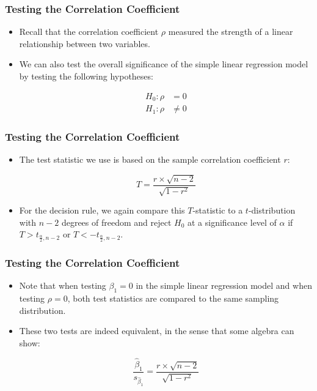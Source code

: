 \documentclass[12pt]{beamer}
\begin{document}
	\begin{frame}
		\frametitle{Testing the Correlation Coefficient}
		
		\begin{itemize}[label={\color{blue}$\blacktriangleright$}]
			\item Recall that the correlation coefficient $\rho$ measured the strength of a linear relationship between two variables.
			
			\item We can also test the overall significance of the simple linear regression model by testing the following hypotheses:
			
			\[
			\begin{aligned}
				H_0 : \rho &= 0 \\
				H_1 : \rho &\neq 0
			\end{aligned}
			\]
			
		\end{itemize}
		
	\end{frame}
	\begin{frame}
		\frametitle{Testing the Correlation Coefficient}
		
		\begin{itemize}[label={\color{blue}$\blacktriangleright$}]
			\item The test statistic we use is based on the sample correlation coefficient $r$:
			
			\[
			T = \frac{r \times \sqrt{n-2}}{\sqrt{1-r^2}}
			\]
			
			\item For the decision rule, we again compare this $T$-statistic to a $t$-distribution with $n-2$ degrees of freedom and reject $H_0$ at a significance level of $\alpha$ if $T > t_{\frac{\alpha}{2},n-2}$ or $T < -t_{\frac{\alpha}{2},n-2}$.
			
		\end{itemize}
		
	\end{frame}
	\begin{frame}
		\frametitle{Testing the Correlation Coefficient}
		
		\begin{itemize}[label={\color{blue}$\blacktriangleright$}]
			\item Note that when testing $\beta_1 = 0$ in the simple linear regression model and when testing $\rho = 0$, both test statistics are compared to the same sampling distribution.
			
			\item These two tests are indeed equivalent, in the sense that some algebra can show:
			
			\[
			\frac{\hat{\beta}_1}{s_{\hat{\beta}_1}} = \frac{r \times \sqrt{n-2}}{\sqrt{1-r^2}}
			\]
			
		\end{itemize}
		
	\end{frame}
\end{document}
